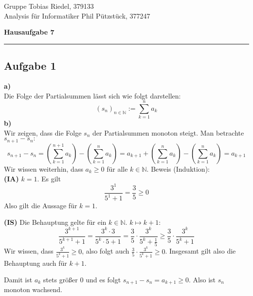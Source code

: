 \documentclass[a4paper,graphics,11pt]{article}
\newcommand{\aufgabe}[1]{\subsection*{Aufgabe #1}}
\begin{document}
\noindent Gruppe              \hfill Tobias Riedel, 379133 \\
\noindent Analysis für Informatiker             \hfill Phil Pützstück, 377247 \\

\begin{center}
	\LARGE{\textbf{Hausaufgabe 7}}
\end{center}
\begin{center}
\rule[0.1ex]{\textwidth}{1pt}
\end{center}



\aufgabe{1}
\textbf{a)}\\[5pt]
Die Folge der Partialsummen lässt sich wie folgt darstellen:
$$
    (s_n)_{n\in \mathbb{N}} := \sum_{k=1}^{n} a_k
$$
\textbf{b)}\\[5pt]
Wir zeigen, dass die Folge $s_n$ der Partialsummen monoton steigt.
Man betrachte $s_{n+1}-s_n\colon$
$$
    s_{n+1} - s_n = \left(\sum_{k=1}^{n+1} a_k\right) - \left(\sum_{k=1}^{n} a_k\right)
    = a_{k+1} + \left(\sum_{k=1}^{n} a_k\right) -\left(\sum_{k=1}^{n} a_k\right)
    = a_{k+1}
$$
Wir wissen weiterhin, dass $a_k \geq 0$ für alle $k \in \mathbb{N}$. Beweis (Induktion):\\
\textbf{(IA)} $k=1$. Es gilt 
$$
    \frac{3^1}{5^1+1} = \frac{3}{5} \geq 0
$$
Also gilt die Aussage für $k=1$.

\textbf{(IS)} Die Behauptung gelte für ein $k \in \mathbb{N}$. $k\mapsto k+1\colon$
$$
    \frac{3^{k+1}}{5^{k+1}+1} = \frac{3^k\cdot3}{5^k\cdot5+1}
    = \frac{3}{5}\cdot \frac{3^k}{5^k+\frac{1}{5}}
    \geq \frac{3}{5}\cdot \frac{3^k}{5^k+1}
$$
Wir wissen, dass $\displaystyle\frac{3^k}{5^k+1}\geq 0$, also folgt auch
$\displaystyle\frac{3}{5} \cdot \frac{3^k}{5^k+1} \geq 0$.
Insgesamt gilt also die Behauptung auch für $k+1$.

Damit ist $a_k$ stets größer 0 und es folgt $s_{n+1}-s_n = a_{k+1} \geq 0$. Also
ist $s_n$ monoton wachsend.
\end{document}
